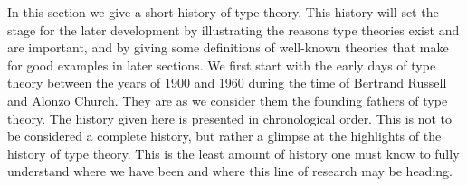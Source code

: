 In this section we give a short history of type theory.  This history
will set the stage for the later development by illustrating the
reasons type theories exist and are important, and by giving some
definitions of well-known theories that make for good examples in
later sections.  We first start with the early days of type theory
between the years of 1900 and 1960 during the time of Bertrand Russell
and Alonzo Church.  They are as we consider them the founding fathers
of type theory.  %
The history given here is presented in chronological order.  This is
not to be considered a complete history, but rather a glimpse at the
highlights of the history of type theory.  This is the least amount of
history one must know to fully understand where we have been and where
this line of research may be heading.


